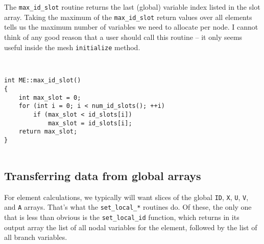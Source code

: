 The {\tt max\_id\_slot} routine returns the last (global) variable
index listed in the slot array.  Taking the maximum of the
{\tt max\_id\_slot} return values over all elements tells us the
maximum number of variables we need to allocate per node.
I cannot think of any good reason that a user should call this
routine -- it only seems useful inside the mesh {\tt initialize}
method.

\begin{verbatim}


int ME::max_id_slot()
{
    int max_slot = 0;
    for (int i = 0; i < num_id_slots(); ++i)
        if (max_slot < id_slots[i])
            max_slot = id_slots[i];
    return max_slot;
}


\end{verbatim}
\subsection{Transferring data from global arrays}

For element calculations, we typically will want slices of the
global {\tt ID}, {\tt X}, {\tt U}, {\tt V}, and {\tt A}
arrays.  That's what the {\tt set\_local\_*} routines do.  Of these,
the only one that is less than obvious is the {\tt set\_local\_id}
function, which returns in its output array the list of all nodal
variables for the element, followed by the list of all branch
variables.

